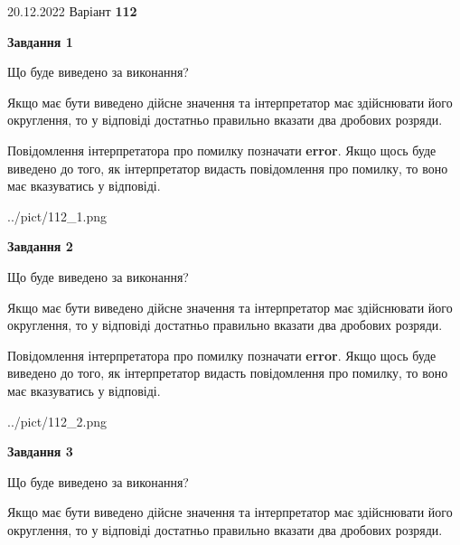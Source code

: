 \documentclass[12pt, ukrainian]{article}
\begin{document}
{20.12.2022 Варіант \No \textbf { 112 }\par}
{
\begin {Large}

{\begin {center}\textbf{Завдання 1}\end {center}}\par
Що буде виведено за виконання? \par

Якщо має бути виведено дійсне значення та інтерпретатор має здійснювати його округлення, 
то у відповіді достатньо правильно вказати два дробових розряди.

Повідомлення інтерпретатора про помилку позначати \textbf{error}.
Якщо щось буде виведено до того, як інтерпретатор видасть повідомлення про помилку, 
то воно має вказуватись у відповіді. \par

\begin{center}
	{../pict/112_1.png}
\end{center}
\newpage

{\begin {center}\textbf{Завдання 2}\end {center}}\par
Що буде виведено за виконання? \par

Якщо має бути виведено дійсне значення та інтерпретатор має здійснювати його округлення, 
то у відповіді достатньо правильно вказати два дробових розряди.

Повідомлення інтерпретатора про помилку позначати \textbf{error}.
Якщо щось буде виведено до того, як інтерпретатор видасть повідомлення про помилку, 
то воно має вказуватись у відповіді. \par

\begin{center}
	{../pict/112_2.png}
\end{center}
\newpage

{\begin {center}\textbf{Завдання 3}\end {center}}\par
Що буде виведено за виконання? \par

Якщо має бути виведено дійсне значення та інтерпретатор має здійснювати його округлення, 
то у відповіді достатньо правильно вказати два дробових розряди.


\end{Large}}
\end{document}
